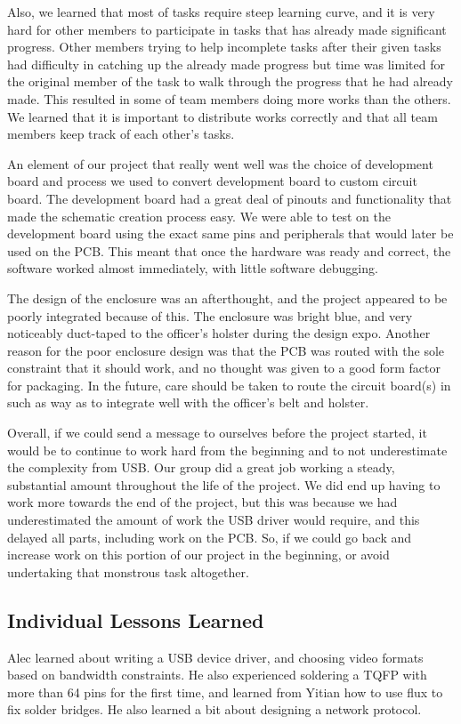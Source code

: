 \documentclass[12pt]{article}
\begin{document}
Also, we learned that most of tasks require steep learning curve, and it is
very hard for other members to participate in tasks that has already made
significant progress. Other members trying to help incomplete tasks after their
given tasks had difficulty in catching up the already made progress but time
was limited for the original member of the task to walk through the progress
that he had already made. This resulted in some of team members doing more
works than the others. We learned that it is important to distribute works
correctly and that all team members keep track of each other's tasks.

An element of our project that really went well was the choice of development
board and process we used to convert development board to custom circuit board.
The development board had a great deal of pinouts and functionality that made
the schematic creation process easy. We were able to test on the development
board using the exact same pins and peripherals that would later be used on the
PCB. This meant that once the hardware was ready and correct, the software
worked almost immediately, with little software debugging.

The design of the enclosure was an afterthought, and the project appeared to be
poorly integrated because of this. The enclosure was bright blue, and very
noticeably duct-taped to the officer's holster during the design expo. Another
reason for the poor enclosure design was that the PCB was routed with the sole
constraint that it should work, and no thought was given to a good form factor
for packaging. In the future, care should be taken to route the circuit
board(s) in such as way as to integrate well with the officer's belt and
holster.

Overall, if we could send a message to ourselves before the project started, it
would be to continue to work hard from the beginning and to not underestimate
the complexity from USB. Our group did a great job working a steady,
substantial amount throughout the life of the project. We did end up having to
work more towards the end of the project, but this was because we had
underestimated the amount of work the USB driver would require, and this
delayed all parts, including work on the PCB. So, if we could go back and
increase work on this portion of our project in the beginning, or avoid
undertaking that monstrous task altogether.

\subsection{Individual Lessons Learned}
Alec learned about writing a USB device driver, and choosing video formats
based on bandwidth constraints. He also experienced soldering a TQFP with more
than 64 pins for the first time, and learned from Yitian how to use flux to fix
solder bridges. He also learned a bit about designing a network protocol.
\end{document}
